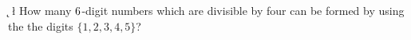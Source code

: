 
%
%
%
%      
% 
% 
%   


\SUBTRACT{}\k
{}\m
\MULTIPLY{}\l
\question How many $6$-digit numbers which are divisible by four can be formed by using the the digits $\lbrace1,2,3,4,5\rbrace$?

